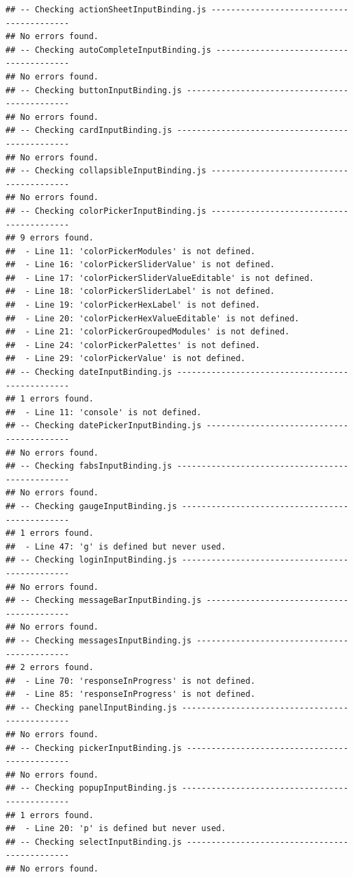 \documentclass[
]{book}
\begin{document}
\begin{verbatim}
## -- Checking actionSheetInputBinding.js ----------------------------------------- 
## No errors found. 
## -- Checking autoCompleteInputBinding.js ---------------------------------------- 
## No errors found. 
## -- Checking buttonInputBinding.js ---------------------------------------------- 
## No errors found. 
## -- Checking cardInputBinding.js ------------------------------------------------ 
## No errors found. 
## -- Checking collapsibleInputBinding.js ----------------------------------------- 
## No errors found. 
## -- Checking colorPickerInputBinding.js ----------------------------------------- 
## 9 errors found. 
##  - Line 11: 'colorPickerModules' is not defined. 
##  - Line 16: 'colorPickerSliderValue' is not defined. 
##  - Line 17: 'colorPickerSliderValueEditable' is not defined. 
##  - Line 18: 'colorPickerSliderLabel' is not defined. 
##  - Line 19: 'colorPickerHexLabel' is not defined. 
##  - Line 20: 'colorPickerHexValueEditable' is not defined. 
##  - Line 21: 'colorPickerGroupedModules' is not defined. 
##  - Line 24: 'colorPickerPalettes' is not defined. 
##  - Line 29: 'colorPickerValue' is not defined. 
## -- Checking dateInputBinding.js ------------------------------------------------ 
## 1 errors found. 
##  - Line 11: 'console' is not defined. 
## -- Checking datePickerInputBinding.js ------------------------------------------ 
## No errors found. 
## -- Checking fabsInputBinding.js ------------------------------------------------ 
## No errors found. 
## -- Checking gaugeInputBinding.js ----------------------------------------------- 
## 1 errors found. 
##  - Line 47: 'g' is defined but never used. 
## -- Checking loginInputBinding.js ----------------------------------------------- 
## No errors found. 
## -- Checking messageBarInputBinding.js ------------------------------------------ 
## No errors found. 
## -- Checking messagesInputBinding.js -------------------------------------------- 
## 2 errors found. 
##  - Line 70: 'responseInProgress' is not defined. 
##  - Line 85: 'responseInProgress' is not defined. 
## -- Checking panelInputBinding.js ----------------------------------------------- 
## No errors found. 
## -- Checking pickerInputBinding.js ---------------------------------------------- 
## No errors found. 
## -- Checking popupInputBinding.js ----------------------------------------------- 
## 1 errors found. 
##  - Line 20: 'p' is defined but never used. 
## -- Checking selectInputBinding.js ---------------------------------------------- 
## No errors found. 

\end{verbatim}
\end{document}
